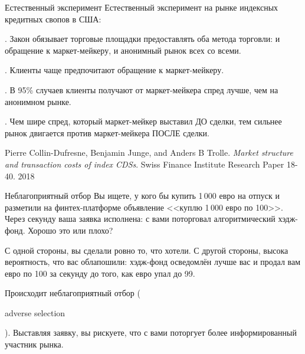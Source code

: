 \documentclass{beamer}
\newcommand{\en}[1]{\begin{otherlanguage}{english}#1\end{otherlanguage}}
\begin{document}
\begin{frame}{Естественный эксперимент}
\justify
Естественный эксперимент на рынке индексных кредитных свопов в США:

. Закон обязывает торговые площадки предоставлять оба метода торговли: и обращение к маркет-мейкеру, и анонимный рынок всех со всеми.

. Клиенты чаще предпочитают обращение к маркет-мейкеру.

. В 95\% случаев клиенты получают от маркет-мейкера спред лучше, чем на анонимном рынке.

. Чем шире спред, который маркет-мейкер выставил ДО сделки, тем сильнее рынок двигается против маркет-мейкера ПОСЛЕ сделки.

\justify
\small{Pierre Collin-Dufresne, Benjamin Junge, and Anders B Trolle. \textit{Market structure and transaction costs of index CDSs}. Swiss Finance Institute Research Paper 18-40. 2018}
\end{frame}


\begin{frame}{Неблагоприятный отбор}
\justify
Вы ищете, у кого бы купить 1\,000 евро на отпуск и разметили на финтех-платформе
объявление <<куплю 1\,000 евро по 100>>. Через секунду ваша заявка 
исполнена: с вами поторговал алгоритмический хэдж-фонд. Хорошо это или плохо?

\justify
С одной стороны, вы сделали ровно то, что хотели. С другой стороны, высока 
вероятность, что вас облапошили: хэдж-фонд осведомлён лучше вас и продал вам
евро по 100 за секунду до того, как евро упал до 99.

\justify
Происходит \alert{неблагоприятный отбор} (\en{adverse selection}). Выставляя 
заявку, вы рискуете, что с вами поторгует более информированный участник рынка.
\end{frame}
\end{document}
